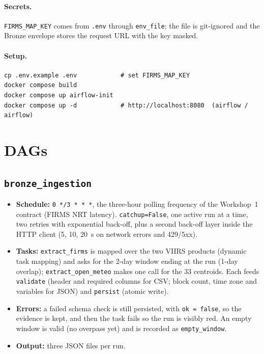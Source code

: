 \documentclass[11pt,a4paper]{article}
\newcommand{\code}[1]{\texttt{\small #1}}
\begin{document}
\paragraph{Secrets.} \code{FIRMS\_MAP\_KEY} comes from \code{.env} through \code{env\_file}; the
file is git-ignored and the Bronze envelope stores the request URL with the key masked.

\paragraph{Setup.}
\begin{Verbatim}[fontsize=\small]
cp .env.example .env            # set FIRMS_MAP_KEY
docker compose build
docker compose up airflow-init
docker compose up -d            # http://localhost:8080  (airflow / airflow)
\end{Verbatim}

\section{DAGs}

\subsection{\code{bronze\_ingestion}}

\begin{itemize}
  \item \textbf{Schedule:} \code{0 */3 * * *}, the three-hour polling frequency of the Workshop~1
        contract (FIRMS NRT latency). \code{catchup=False}, one active run at a time, two retries with
        exponential back-off, plus a second back-off layer inside the HTTP client (5, 10, 20~s on
        network errors and 429/5xx).
  \item \textbf{Tasks:} \code{extract\_firms} is mapped over the two VIIRS products (dynamic task
        mapping) and asks for the 2-day window ending at the run (1-day overlap);
        \code{extract\_open\_meteo} makes one call for the 33 centroids. Each feeds \code{validate}
        (header and required columns for CSV; block count, time zone and variables for JSON) and
        \code{persist} (atomic write).
  \item \textbf{Errors:} a failed schema check is still persisted, with \code{ok = false}, so the
        evidence is kept, and then the task fails so the run is visibly red. An empty window is valid
        (no overpass yet) and is recorded as \code{empty\_window}.
  \item \textbf{Output:} three JSON files per run.
\end{itemize}
\end{document}
